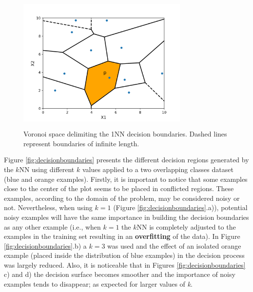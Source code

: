 \begin{figure}[h]
    \centering
    \includegraphics[height = 7cm, width =  8.5cm]{figures/voronoi2.png}
    \caption{Voronoi space delimiting the 1NN decision boundaries. Dashed lines represent boundaries of infinite length.}
    \label{fig:voronoi}
\end{figure}

Figure \ref{fig:decisionboundaries} presents the different decision regions generated by the $k$NN using different $k$ values applied to a two overlapping classes dataset (blue and orange examples). Firstly, it is important to notice that some examples close to the center of the plot seems to be placed in conflicted regions. These examples, according to the domain of the problem, may be considered noisy or not. Nevertheless, when using $k = 1$ (Figure \ref{fig:decisionboundaries}.a)), potential noisy examples will have the same importance in building the decision boundaries as any other example (i.e., when $k = 1$ the $k$NN is completely adjusted to the examples in the training set resulting in an \textbf{overfitting} of the data). In Figure \ref{fig:decisionboundaries}.b) a $k = 3$ was used and the effect of an isolated orange example (placed inside the distribution of blue examples) in the decision process was largely reduced. Also, it is noticeable that in Figures \ref{fig:decisionboundaries} c) and d) the decision surface becomes smoother and the importance of noisy examples tends to disappear; as expected for larger values of \textit{k}. 

